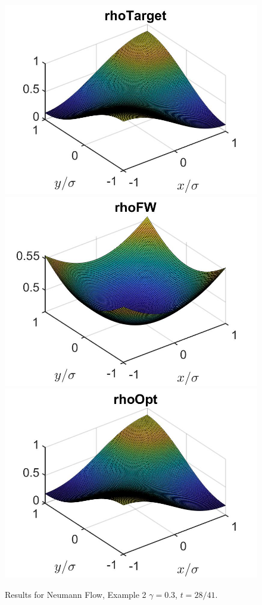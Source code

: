 \documentclass[11pt, a4paper]{article}
\theoremstyle{definition}
\begin{document}
\begin{figure}[h]
	\includegraphics[scale=0.3]{rhoHat2DN3a.jpg}
	\includegraphics[scale=0.3]{rhoFW2DN3a.jpg}
	\includegraphics[scale=0.3]{rhoOpt2D3a.jpg}
	\caption{Results for Neumann Flow, Example 2 $\gamma = 0.3$, $t = 28/41$.}
	\label{Ex12DN3a}
\end{figure}
\end{document}
